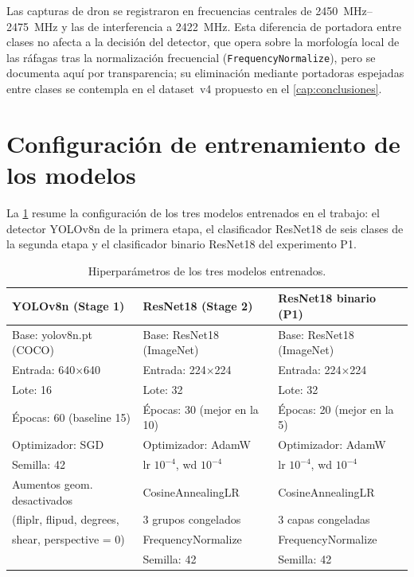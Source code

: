 Las capturas de dron se registraron en frecuencias centrales de \SIrange{2450}{2475}{\mega\hertz} y las de interferencia a \SI{2422}{\mega\hertz}. Esta diferencia de portadora entre clases no afecta a la decisión del detector, que opera sobre la morfología local de las ráfagas tras la normalización frecuencial (\texttt{FrequencyNormalize}), pero se documenta aquí por transparencia; su eliminación mediante portadoras espejadas entre clases se contempla en el dataset~v4 propuesto en el \cref{cap:conclusiones}.

\section{Configuración de entrenamiento de los modelos}
\label{anexo:hiperparametros}

La \cref{tab:anexo_hiperparametros} resume la configuración de los tres modelos entrenados en el trabajo: el detector YOLOv8n de la primera etapa, el clasificador ResNet18 de seis clases de la segunda etapa y el clasificador binario ResNet18 del experimento P1.

\begin{table}[htbp]
\centering
\footnotesize
\caption{Hiperparámetros de los tres modelos entrenados.}
\label{tab:anexo_hiperparametros}
\begin{tabular}{lll}
\toprule
\textbf{YOLOv8n (Stage 1)} & \textbf{ResNet18 (Stage 2)} & \textbf{ResNet18 binario (P1)} \\
\midrule
Base: yolov8n.pt (COCO)      & Base: ResNet18 (ImageNet)   & Base: ResNet18 (ImageNet) \\
Entrada: 640$\times$640       & Entrada: 224$\times$224     & Entrada: 224$\times$224 \\
Lote: 16                      & Lote: 32                    & Lote: 32 \\
Épocas: 60 (baseline 15)      & Épocas: 30 (mejor en la 10) & Épocas: 20 (mejor en la 5) \\
Optimizador: SGD              & Optimizador: AdamW          & Optimizador: AdamW \\
Semilla: 42                   & lr $10^{-4}$, wd $10^{-4}$   & lr $10^{-4}$, wd $10^{-4}$ \\
Aumentos geom. desactivados   & CosineAnnealingLR           & CosineAnnealingLR \\
(fliplr, flipud, degrees,     & 3 grupos congelados         & 3 capas congeladas \\
shear, perspective = 0)       & FrequencyNormalize          & FrequencyNormalize \\
                              & Semilla: 42                 & Semilla: 42 \\
\bottomrule
\end{tabular}
\end{table}

